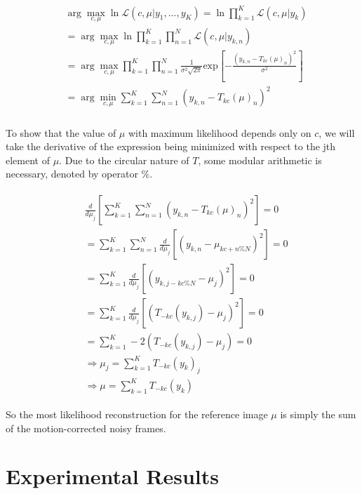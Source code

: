 \documentclass{article}
\begin{document}
\begin{eqnarray*}
\begin{aligned}
  &\arg \max_{c, \mu} \ln \mathcal{L}(c, \mu | y_1, ..., y_K) = \ln \prod_{k=1}^K \mathcal{L}(c, \mu | y_k) \\
  &=\arg \max_{c, \mu} \ln \prod_{k=1}^K \prod_{n=1}^N \mathcal{L}(c, \mu | y_{k,n}) \\
  &=\arg \max_{c, \mu} \prod_{k=1}^K \prod_{n=1}^N \frac{1}{\sigma^2 \sqrt{2 \pi}} \text{exp} \left[- \frac{(y_{k,n} - T_{kc}(\mu)_n)^2}{\sigma^2}\right] \\
  &=\arg \min_{c, \mu} \sum_{k=1}^K \sum_{n=1}^N (y_{k,n} - T_{kc}(\mu)_n)^2 \\
\end{aligned}
\end{eqnarray*}

To show that the value of $\mu$ with maximum likelihood depends only on $c$, we will take the derivative of the expression being minimized with respect to the jth element of $\mu$.  Due to the circular nature of $T$, some modular arithmetic is necessary, denoted by operator $\%$.

\begin{eqnarray*}
\begin{aligned}
  &\frac{d}{d\mu_j}\left[\sum_{k=1}^K \sum_{n=1}^N (y_{k,n} - T_{kc}(\mu)_n)^2\right] = 0 \\
  &=\sum_{k=1}^K \sum_{n=1}^N \frac{d}{d\mu_j}\left[(y_{k,n} - \mu_{kc + n \% N})^2\right] = 0 \\
  &=\sum_{k=1}^K \frac{d}{d\mu_j}\left[(y_{k,j - kc \% N} - \mu_j)^2\right] = 0 \\
  &=\sum_{k=1}^K \frac{d}{d\mu_j}\left[(T_{-kc}(y_{k,j}) - \mu_j)^2\right] = 0 \\
  &=\sum_{k=1}^K -2(T_{-kc}(y_{k,j}) - \mu_j) = 0 \\
  &\Longrightarrow \mu_j = \sum_{k=1}^K T_{-kc}(y_k)_j \\
  &\Longrightarrow \mu = \sum_{k=1}^K T_{-kc}(y_k)
\end{aligned}
\end{eqnarray*}

So the most likelihood reconstruction for the reference image $\mu$ is simply the sum of the motion-corrected noisy frames.

\section{Experimental Results}
\label{sec:results}
\end{document}
